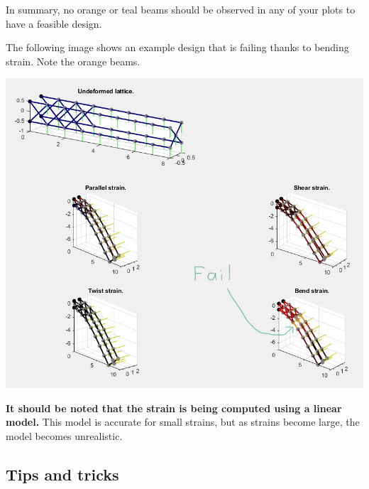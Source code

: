 \documentclass{article}
\begin{document}
In summary, no orange or teal beams should be observed in any of your plots to have a feasible design. 

The following image shows an example design that is failing thanks to bending strain. Note the orange beams.
\begin{center}
\includegraphics[width =\textwidth]{Example_output_annotated.jpg}
\end{center}

{\bf It should be noted that the strain is being computed using a linear model.} This model is accurate for small strains, but as strains become large, the model becomes unrealistic. 



\subsection{Tips and tricks}
\end{document}
